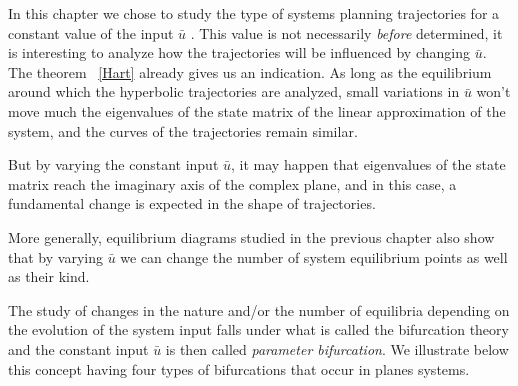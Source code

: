 %


In this chapter we chose to study the type of systems planning trajectories for a constant 
value of the input $\bar u$ . This value is not necessarily {\em before} determined, 
it is interesting to analyze how the trajectories will be influenced by changing $\bar u$.
The theorem ~\ref{Hart} already gives us an indication. As long as the equilibrium around
which the hyperbolic trajectories are analyzed, small variations in $\bar u$
won't move much the eigenvalues of the state matrix of the linear approximation
of the system, and the curves of the trajectories remain similar.

But by varying the constant input $\bar u$, it may happen that eigenvalues of the state matrix 
reach the imaginary axis of the complex plane, and
in this case, a fundamental change is expected in the shape of trajectories.

More generally, equilibrium diagrams studied in the previous chapter also show that by
varying $\bar u$ we can change the number of system equilibrium points as well as their kind.

The study of changes in the nature and/or the number of
equilibria depending on the evolution of the system input
falls under what is called the bifurcation theory and the constant input $\bar u$ is then
called {\em parameter bifurcation}. We illustrate below this concept
having four types of bifurcations that occur in planes systems.


